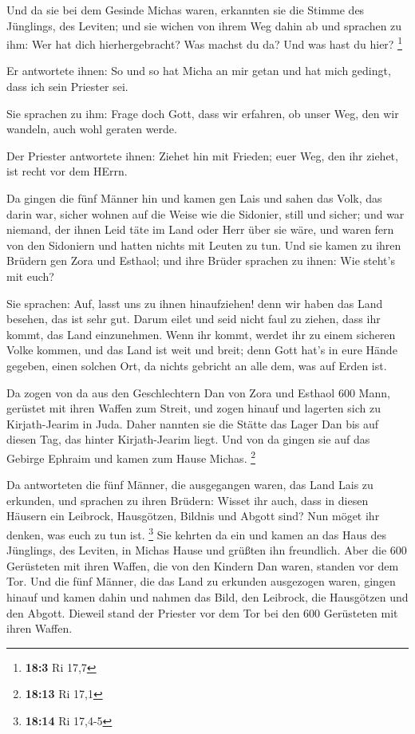  Und da sie bei dem Gesinde Michas waren, erkannten sie die
Stimme des Jünglings, des Leviten; und sie wichen von ihrem Weg dahin ab
und sprachen zu ihm: Wer hat dich hierhergebracht? Was machst du da? Und
was hast du hier? \footnote{\textbf{18:3} Ri 17,7}

 Er antwortete ihnen: So und so hat Micha an mir getan und
hat mich gedingt, dass ich sein Priester sei.

 Sie sprachen zu ihm: Frage doch Gott, dass wir erfahren, ob
unser Weg, den wir wandeln, auch wohl geraten werde.

 Der Priester antwortete ihnen: Ziehet hin mit Frieden; euer
Weg, den ihr ziehet, ist recht vor dem HErrn.

 Da gingen die fünf Männer hin und kamen gen Lais und sahen
das Volk, das darin war, sicher wohnen auf die Weise wie die Sidonier,
still und sicher; und war niemand, der ihnen Leid täte im Land oder Herr
über sie wäre, und waren fern von den Sidoniern und hatten nichts mit
Leuten zu tun.  Und sie kamen zu ihren Brüdern gen Zora und
Esthaol; und ihre Brüder sprachen zu ihnen: Wie steht's mit euch?

 Sie sprachen: Auf, lasst uns zu ihnen hinaufziehen! denn
wir haben das Land besehen, das ist sehr gut. Darum eilet und seid nicht
faul zu ziehen, dass ihr kommt, das Land einzunehmen.  Wenn
ihr kommt, werdet ihr zu einem sicheren Volke kommen, und das Land ist
weit und breit; denn Gott hat's in eure Hände gegeben, einen solchen
Ort, da nichts gebricht an alle dem, was auf Erden ist.

 Da zogen von da aus den Geschlechtern Dan von Zora und
Esthaol 600 Mann, gerüstet mit ihren Waffen zum Streit, 
und zogen hinauf und lagerten sich zu Kirjath-Jearim in Juda. Daher
nannten sie die Stätte das Lager Dan bis auf diesen Tag, das hinter
Kirjath-Jearim liegt.  Und von da gingen sie auf das
Gebirge Ephraim und kamen zum Hause Michas. \footnote{\textbf{18:13} Ri
  17,1}

 Da antworteten die fünf Männer, die ausgegangen waren, das
Land Lais zu erkunden, und sprachen zu ihren Brüdern: Wisset ihr auch,
dass in diesen Häusern ein Leibrock, Hausgötzen, Bildnis und Abgott
sind? Nun möget ihr denken, was euch zu tun ist. \footnote{\textbf{18:14}
  Ri 17,4-5}  Sie kehrten da ein und kamen an das Haus des
Jünglings, des Leviten, in Michas Hause und grüßten ihn freundlich.
 Aber die 600 Gerüsteten mit ihren Waffen, die von den
Kindern Dan waren, standen vor dem Tor.  Und die fünf
Männer, die das Land zu erkunden ausgezogen waren, gingen hinauf und
kamen dahin und nahmen das Bild, den Leibrock, die Hausgötzen und den
Abgott. Dieweil stand der Priester vor dem Tor bei den 600 Gerüsteten
mit ihren Waffen.

